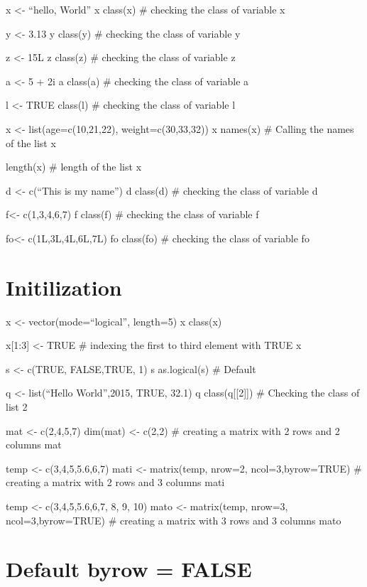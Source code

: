 \documentclass[
]{article}
\author{}
\date{\vspace{-2.5em}}
\begin{document}
x \textless- ``hello, World'' x class(x) \# checking the class of
variable x

y \textless- 3.13 y class(y) \# checking the class of variable y

z \textless- 15L z class(z) \# checking the class of variable z

a \textless- 5 + 2i a class(a) \# checking the class of variable a

l \textless- TRUE class(l) \# checking the class of variable l

x \textless- list(age=c(10,21,22), weight=c(30,33,32)) x names(x) \#
Calling the names of the list x

length(x) \# length of the list x

d \textless- c(``This is my name'') d class(d) \# checking the class of
variable d

f\textless- c(1,3,4,6,7) f class(f) \# checking the class of variable f

fo\textless- c(1L,3L,4L,6L,7L) fo class(fo) \# checking the class of
variable fo

\section{Initilization}\label{initilization}

x \textless- vector(mode=``logical'', length=5) x class(x)

x{[}1:3{]} \textless- TRUE \# indexing the first to third element with
TRUE x

s \textless- c(TRUE, FALSE,TRUE, 1) s as.logical(s) \# Default

q \textless- list(``Hello World'',2015, TRUE, 32.1) q
class(q{[}{[}2{]}{]}) \# Checking the class of list 2

mat \textless- c(2,4,5,7) dim(mat) \textless- c(2,2) \# creating a
matrix with 2 rows and 2 columns mat

temp \textless- c(3,4,5,5.6,6,7) mati \textless- matrix(temp, nrow=2,
ncol=3,byrow=TRUE) \# creating a matrix with 2 rows and 3 columns mati

temp \textless- c(3,4,5,5.6,6,7, 8, 9, 10) mato \textless- matrix(temp,
nrow=3, ncol=3,byrow=TRUE) \# creating a matrix with 3 rows and 3
columns mato

\section{Default byrow = FALSE}\label{default-byrow-false}
\end{document}

